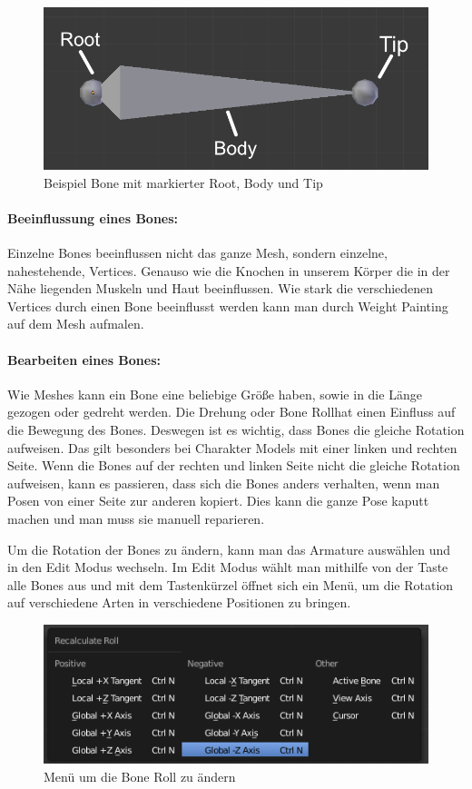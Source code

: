 \begin{figure}[H]
    \centering

    \includegraphics[width=.8\textwidth]{images/rigging_bone.png}
    \caption{Beispiel Bone mit markierter Root, Body und Tip}
\end{figure}

\paragraph{Beeinflussung eines Bones:}
Einzelne Bones beeinflussen nicht das ganze Mesh, sondern einzelne, nahestehende, Vertices. Genauso wie die Knochen in unserem Körper die in der Nähe liegenden Muskeln und Haut beeinflussen.
Wie stark die verschiedenen Vertices durch einen Bone beeinflusst werden kann man durch Weight Painting auf dem Mesh \dq aufmalen\dq.

\paragraph{Bearbeiten eines Bones:}
Wie Meshes kann ein Bone eine beliebige Größe haben, sowie in die Länge gezogen oder gedreht werden.
Die Drehung oder \dq Bone Roll\dq hat einen Einfluss auf die Bewegung des Bones. Deswegen ist es wichtig, dass Bones die gleiche Rotation aufweisen. Das gilt besonders bei Charakter Models mit einer linken und rechten Seite.
Wenn die Bones auf der rechten und linken Seite nicht die gleiche Rotation aufweisen, kann es passieren, dass sich die Bones anders verhalten, wenn man Posen von einer Seite zur anderen kopiert.
Dies kann die ganze Pose kaputt machen und man muss sie manuell reparieren.

Um die Rotation der Bones zu ändern, kann man das Armature auswählen und in den Edit Modus wechseln.
Im Edit Modus wählt man mithilfe von der Taste  alle Bones aus und mit dem Tastenkürzel  öffnet sich ein Menü, um die Rotation auf
verschiedene Arten in verschiedene Positionen zu bringen.

\begin{figure}[H]
    \centering

    \includegraphics[width=.8\textwidth]{images/bone_roll_recalculate.png}
    \caption{Menü um die Bone Roll zu ändern}
\end{figure}

